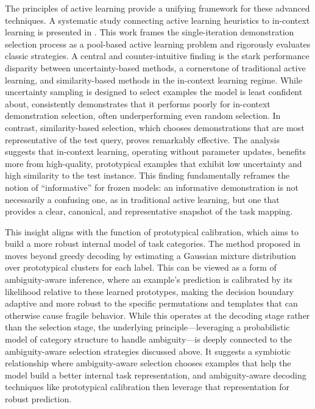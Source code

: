 \documentclass[11pt]{article}
\begin{document}
The principles of active learning provide a unifying framework for these advanced techniques. A systematic study connecting active learning heuristics to in-context learning is presented in \cite{ref129}. This work frames the single-iteration demonstration selection process as a pool-based active learning problem and rigorously evaluates classic strategies. A central and counter-intuitive finding is the stark performance disparity between uncertainty-based methods, a cornerstone of traditional active learning, and similarity-based methods in the in-context learning regime. While uncertainty sampling is designed to select examples the model is least confident about, \cite{ref129} consistently demonstrates that it performs poorly for in-context demonstration selection, often underperforming even random selection. In contrast, similarity-based selection, which chooses demonstrations that are most representative of the test query, proves remarkably effective. The analysis suggests that in-context learning, operating without parameter updates, benefits more from high-quality, prototypical examples that exhibit low uncertainty and high similarity to the test instance. This finding fundamentally reframes the notion of ``informative'' for frozen models: an informative demonstration is not necessarily a confusing one, as in traditional active learning, but one that provides a clear, canonical, and representative snapshot of the task mapping.

This insight aligns with the function of prototypical calibration, which aims to build a more robust internal model of task categories. The method proposed in \cite{ref131} moves beyond greedy decoding by estimating a Gaussian mixture distribution over prototypical clusters for each label. This can be viewed as a form of ambiguity-aware inference, where an example's prediction is calibrated by its likelihood relative to these learned prototypes, making the decision boundary adaptive and more robust to the specific permutations and templates that can otherwise cause fragile behavior. While this operates at the decoding stage rather than the selection stage, the underlying principle---leveraging a probabilistic model of category structure to handle ambiguity---is deeply connected to the ambiguity-aware selection strategies discussed above. It suggests a symbiotic relationship where ambiguity-aware selection chooses examples that help the model build a better internal task representation, and ambiguity-aware decoding techniques like prototypical calibration then leverage that representation for robust prediction.
\end{document}
